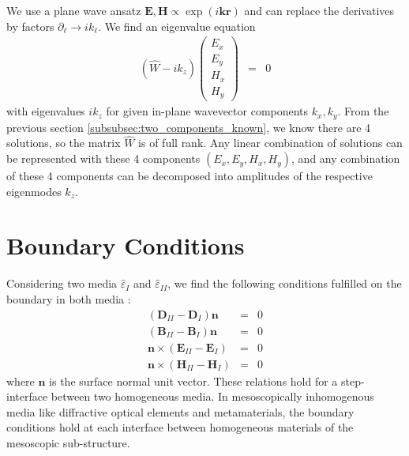 \documentclass[12pt,a4paper,twoside,openright,BCOR10mm,headsepline,titlepage,abstracton,chapterprefix,final]{scrreprt}
\newcommand\Vector[1]{{\mathbf{#1}}}
\newcommand\Location{\Vector{r}}
\newcommand\wavenumber{k}
\newcommand\Wavevector{\Vector{\wavenumber}}
\newcommand\Tensor[1]{\hat{#1}}
\newcommand\scalarEfield{E}
\newcommand\scalarBfield{B}
\newcommand\scalarHfield{H}
\newcommand\scalarDfield{D}
\newcommand\Efield{\Vector{\scalarEfield}}
\newcommand\Bfield{\Vector{\scalarBfield}}
\newcommand\Hfield{\Vector{\scalarHfield}}
\newcommand\Dfield{\Vector{\scalarDfield}}
\newcommand\permittivity{\Tensor{\scalarpermittivity}}
\newcommand\scalarpermittivity{\varepsilon}
\newcommand\materialone{I}
\newcommand\materialtwo{{II}}
\begin{document}
 We use a plane wave ansatz
 $\Efield, \Hfield \propto \exp(i\Wavevector\Location)$
 and can replace the derivatives by factors
 $\partial_\ell \rightarrow i \wavenumber_\ell$.
 We find an eigenvalue equation
 \begin{eqnarray}
   \left( \Tensor{W} - i \wavenumber_z \right)
     \begin{pmatrix} 
     \scalarEfield_x \\ \scalarEfield_y  \\ \scalarHfield_x \\ \scalarHfield_y \end{pmatrix}
     &=& 0
\end{eqnarray}
with eigenvalues $i \wavenumber_z$ for given in-plane wavevector components $\wavenumber_x, \wavenumber_y$.
From the previous section \ref{subsubsec:two_components_known}, we know there are 4 solutions, so the matrix $\Tensor{W}$ is of full rank.
Any linear combination of solutions can be represented with these 4 components
$(\scalarEfield_x, \scalarEfield_y, \scalarHfield_x, \scalarHfield_y)$,
and any combination of these 4 components can be decomposed into amplitudes of the respective eigenmodes $\wavenumber_z$.


\section{Boundary Conditions}
Considering two media $\permittivity_\materialone$ and $\permittivity_\materialtwo$, we find the following conditions fulfilled on the boundary in both media \cite{Jackson}:
\begin{subequations}
\begin{eqnarray}
 ( \Dfield_\materialtwo - \Dfield_\materialone ) \Vector{n} &=& 0 \\
 ( \Bfield_\materialtwo - \Bfield_\materialone ) \Vector{n} &=& 0 \\
 \Vector{n} \times ( \Efield_\materialtwo - \Efield_\materialone ) &=& 0 \\
 \Vector{n} \times ( \Hfield_\materialtwo - \Hfield_\materialone ) &=& 0 
\end{eqnarray}
\label{eq:boundary_conditions} 
\end{subequations}
where $\Vector{n}$ is the surface normal unit vector.
These relations hold for a step-interface between two homogeneous media. 
In mesoscopically inhomogenous media like  diffractive optical elements and metamaterials, 
the boundary conditions hold at each interface between homogeneous materials of the mesoscopic sub-structure.
\end{document}
